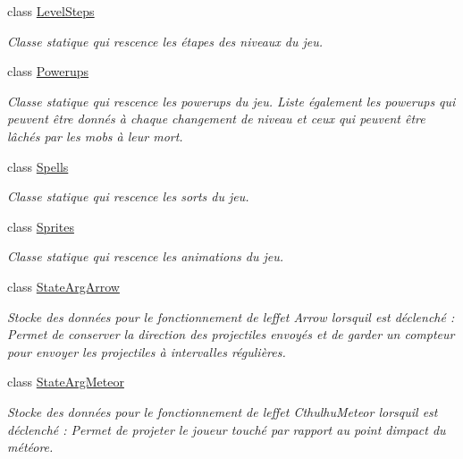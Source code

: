 \begin{DoxyCompactItemize}
class \hyperlink{class_tentacle_slicers_1_1customs_1_1_level_steps}{Level\+Steps}
\begin{DoxyCompactList}\small\item\em Classe statique qui rescence les étapes des niveaux du jeu. \end{DoxyCompactList}\item 
class \hyperlink{class_tentacle_slicers_1_1customs_1_1_powerups}{Powerups}
\begin{DoxyCompactList}\small\item\em Classe statique qui rescence les powerups du jeu. Liste également les powerups qui peuvent être donnés à chaque changement de niveau et ceux qui peuvent être lâchés par les mobs à leur mort. \end{DoxyCompactList}\item 
class \hyperlink{class_tentacle_slicers_1_1customs_1_1_spells}{Spells}
\begin{DoxyCompactList}\small\item\em Classe statique qui rescence les sorts du jeu. \end{DoxyCompactList}\item 
class \hyperlink{class_tentacle_slicers_1_1customs_1_1_sprites}{Sprites}
\begin{DoxyCompactList}\small\item\em Classe statique qui rescence les animations du jeu. \end{DoxyCompactList}\item 
class \hyperlink{class_tentacle_slicers_1_1customs_1_1_state_arg_arrow}{State\+Arg\+Arrow}
\begin{DoxyCompactList}\small\item\em Stocke des données pour le fonctionnement de l\textquotesingle{}effet Arrow lorsqu\textquotesingle{}il est déclenché \+: Permet de conserver la direction des projectiles envoyés et de garder un compteur pour envoyer les projectiles à intervalles régulières. \end{DoxyCompactList}\item 
class \hyperlink{class_tentacle_slicers_1_1customs_1_1_state_arg_meteor}{State\+Arg\+Meteor}
\begin{DoxyCompactList}\small\item\em Stocke des données pour le fonctionnement de l\textquotesingle{}effet Cthulhu\+Meteor lorsqu\textquotesingle{}il est déclenché \+: Permet de projeter le joueur touché par rapport au point d\textquotesingle{}impact du météore. \end{DoxyCompactList}\item 

\end{DoxyCompactItemize}
